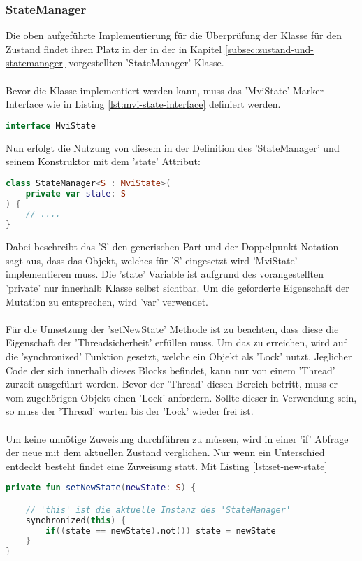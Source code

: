 \subsubsection{StateManager}
\label{subsubsec:state-manager}
Die oben aufgeführte Implementierung für die Überprüfung der Klasse für den Zustand findet ihren Platz in der in der in Kapitel
\ref{subsec:zustand-und-statemanager}
vorgestellten 'StateManager' Klasse.
\\\\
Bevor die Klasse implementiert werden kann, muss das 'MviState' Marker Interface wie in Listing
\ref{lst:mvi-state-interface}
definiert werden.
\begin{lstlisting}[caption={'MviState' Interface}, label={lst:mvi-state-interface}, language=Kotlin]
interface MviState
\end{lstlisting}
\bigskip
Nun erfolgt die Nutzung von diesem in der Definition des 'StateManager' und seinem Konstruktor mit dem 'state' Attribut:
\begin{lstlisting}[caption={ 'StateManager' mit 'MviState'}, label={lst:state-manger-definiton}, language=Kotlin]
class StateManager<S : MviState>(
	private var state: S
) {
	// ....
}
\end{lstlisting}
Dabei beschreibt das 'S' den generischen Part und der Doppelpunkt Notation sagt aus, dass das Objekt, welches für 'S' eingesetzt wird 'MviState' implementieren muss. Die 'state' Variable ist aufgrund des vorangestellten 'private' nur innerhalb Klasse selbst sichtbar. Um die geforderte Eigenschaft der Mutation zu entsprechen, wird 'var' verwendet. 
\\\\
Für die Umsetzung der 'setNewState' Methode ist zu beachten, dass diese die Eigenschaft der 'Threadsicherheit' erfüllen muss. Um das zu erreichen, wird auf die 'synchronized' Funktion gesetzt, welche ein Objekt als 'Lock' nutzt. Jeglicher Code der sich innerhalb dieses Blocks befindet, kann nur von einem 'Thread' zurzeit ausgeführt werden. Bevor der 'Thread' diesen Bereich betritt, muss er vom zugehörigen Objekt einen 'Lock' anfordern. Sollte dieser in Verwendung sein, so muss der 'Thread' warten bis der 'Lock' wieder frei ist. 
\\\\
Um keine unnötige Zuweisung durchführen zu müssen, wird in einer 'if' Abfrage der neue mit dem aktuellen Zustand verglichen. Nur wenn ein Unterschied entdeckt besteht findet eine Zuweisung statt.
Mit Listing
\ref{lst:set-new-state}
\begin{lstlisting}[caption={ 'setNewState' Methode}, label={lst:set-new-state}, language=Kotlin]
private fun setNewState(newState: S) {

	// 'this' ist die aktuelle Instanz des 'StateManager'
	synchronized(this) {
		if((state == newState).not()) state = newState
	}
}
\end{lstlisting}
